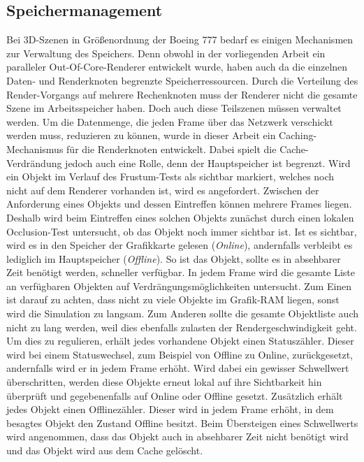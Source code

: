 \subsection{Speichermanagement}
\label{sec:basics:speicher}
Bei 3D-Szenen in Größenordnung der Boeing 777 bedarf es einigen Mechanismen zur Verwaltung des Speichers. Denn obwohl in der vorliegenden Arbeit ein paralleler Out-Of-Core-Renderer entwickelt wurde, haben auch da die einzelnen Daten- und Renderknoten begrenzte Speicherressourcen. Durch die Verteilung des Render-Vorgangs auf mehrere Rechenknoten muss der Renderer nicht die gesamte Szene im Arbeitsspeicher haben. Doch auch diese Teilszenen müssen verwaltet werden. Um die Datenmenge, die jeden Frame über das Netzwerk verschickt werden muss, reduzieren zu können, wurde in dieser Arbeit ein Caching-Mechanismus für die Renderknoten entwickelt. Dabei spielt die Cache-Verdrändung jedoch auch eine Rolle, denn der Hauptspeicher ist begrenzt. Wird ein Objekt im Verlauf des Frustum-Tests als sichtbar markiert, welches noch nicht auf dem Renderer vorhanden ist, wird es angefordert. Zwischen der Anforderung eines Objekts und dessen Eintreffen können mehrere Frames liegen. Deshalb wird beim Eintreffen eines solchen Objekts zunächst durch einen lokalen Occlusion-Test untersucht, ob das Objekt noch immer sichtbar ist. Ist es sichtbar, wird es in den Speicher der Grafikkarte gelesen (\textit{Online}), andernfalls verbleibt es lediglich im Hauptspeicher (\textit{Offline}). So ist das Objekt, sollte es in absehbarer Zeit benötigt werden, schneller verfügbar. In jedem Frame wird die gesamte Liste an verfügbaren Objekten auf Verdrängungsmöglichkeiten untersucht. Zum Einen ist darauf zu achten, dass nicht zu viele Objekte im Grafik-RAM liegen, sonst wird die Simulation zu langsam. Zum Anderen sollte die gesamte Objektliste auch nicht zu lang werden, weil dies ebenfalls zulasten der Rendergeschwindigkeit geht.\\
Um dies zu regulieren, erhält jedes vorhandene Objekt einen Statuszähler. Dieser wird bei einem Statuswechsel, zum Beispiel von Offline zu Online, zurückgesetzt, andernfalls wird er in jedem Frame erhöht. Wird dabei ein gewisser Schwellwert überschritten, werden diese Objekte erneut lokal auf ihre Sichtbarkeit hin überprüft und gegebenenfalls auf Online oder Offline gesetzt. Zusätzlich erhält jedes Objekt einen Offlinezähler. Dieser wird in jedem Frame erhöht, in dem besagtes Objekt den Zustand Offline besitzt. Beim Übersteigen eines Schwellwerts wird angenommen, dass das Objekt auch in absehbarer Zeit nicht benötigt wird und das Objekt wird aus dem Cache gelöscht.
